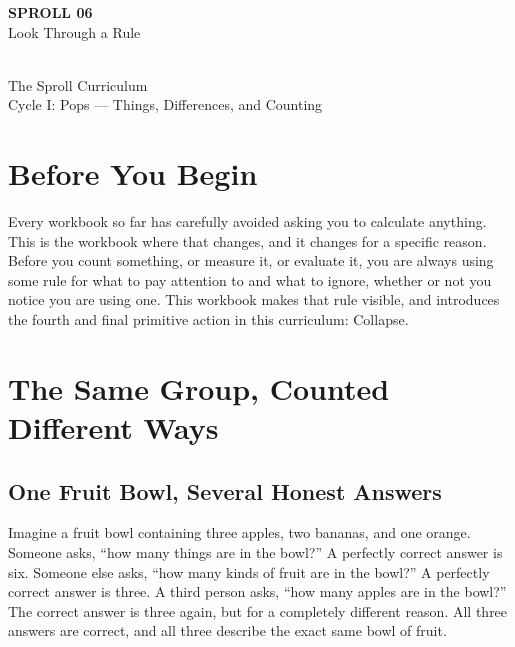\documentclass[11pt]{book}
\begin{document}
\begin{titlepage}
\centering
\vspace*{1.4in}
{\Huge \textbf{SPROLL 06}}\\[0.5in]
{\huge Look Through a Rule}\\[0.8in]
\\[0.8in]
{\Large The Sproll Curriculum}\\[0.2in]
{\large Cycle I: Pops --- Things, Differences, and Counting}
\end{titlepage}

\tableofcontents

\chapter*{Before You Begin}

Every workbook so far has carefully avoided asking you to calculate anything. This is the workbook where that changes, and it changes for a specific reason. Before you count something, or measure it, or evaluate it, you are always using some rule for what to pay attention to and what to ignore, whether or not you notice you are using one. This workbook makes that rule visible, and introduces the fourth and final primitive action in this curriculum: Collapse.

\chapter{The Same Group, Counted Different Ways}

\section{One Fruit Bowl, Several Honest Answers}

Imagine a fruit bowl containing three apples, two bananas, and one orange. Someone asks, ``how many things are in the bowl?'' A perfectly correct answer is six. Someone else asks, ``how many kinds of fruit are in the bowl?'' A perfectly correct answer is three. A third person asks, ``how many apples are in the bowl?'' The correct answer is three again, but for a completely different reason. All three answers are correct, and all three describe the exact same bowl of fruit.
\end{document}
